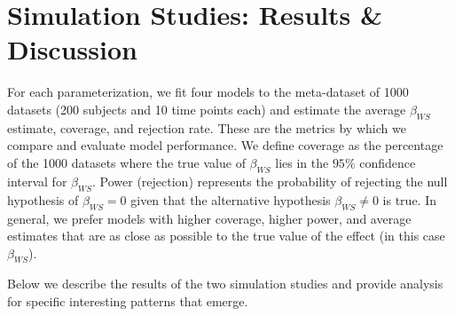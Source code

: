 \documentclass{article}
\begin{document}
\section{Simulation Studies: Results \& Discussion}
    For each parameterization, we fit four models to the meta-dataset of 1000 datasets (200 subjects and 10 time points each) and estimate the average $\beta_{WS}$ estimate, coverage, and rejection rate. These are the metrics by which we compare and evaluate model performance. We define coverage as the percentage of the 1000 datasets where the true value of $\beta_{WS}$ lies in the $95\%$ confidence interval for $\hat{\beta}_{WS}$. Power (rejection) represents the probability of rejecting the null hypothesis of $\beta_{WS} = 0$ given that the alternative hypothesis $\beta_{WS} \neq 0$ is true. In general, we prefer models with higher coverage, higher power, and average estimates that are as close as possible to the true value of the effect (in this case $\beta_{WS}$).

    Below we describe the results of the two simulation studies and provide analysis for specific interesting patterns that emerge.
    
\end{document}
